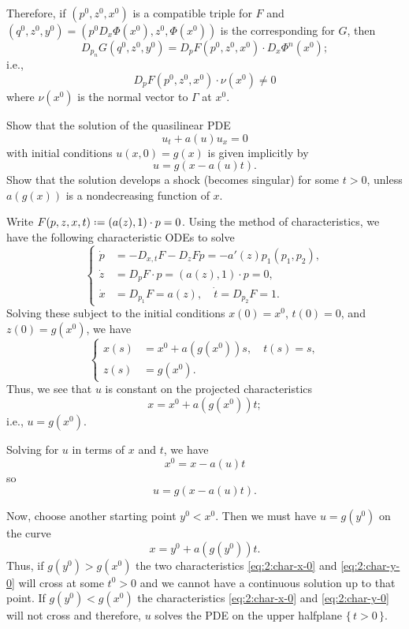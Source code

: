 \begin{solution*}
  Therefore, if \((p^0,z^0,x^0)\) is a compatible triple for \(F\) and
  \((q^0,z^0,y^0)=(p^0D_x\Phi(x^0),z^0,\Phi(x^0))\) is the corresponding
  for \(G\), then
  \[
    D_{p_n}G(q^0,z^0,y^0)=D_pF(p^0,z^0,x^0)\cdot D_x\Phi^n(x^0);
  \]
  i.e.,
  \[
    D_p F(p^0,z^0,x^0)\cdot\nu(x^0)\neq 0
  \]
  where \(\nu(x^0)\) is the normal vector to \(\Gamma\) at \(x^0\).
\end{solution*}

\begin{problem}
  Show that the solution of the quasilinear PDE
  \[
    u_t+a(u)u_x=0
  \]
  with initial conditions \(u(x,0)=g(x)\) is given implicitly by
  \[
    u=g(x-a(u)t).
  \]
  Show that the solution develops a shock (becomes singular) for some
  \(t>0\), unless \(a(g(x))\) is a nondecreasing function of
  \(x\).
\end{problem}
\begin{solution*}
  Write \(F(p,z,x,t)\defeq (a(z),1)\cdot p=0\). Using the method of
  characteristics, we have the following characteristic ODEs to solve
  \[
    \left\{
      \begin{aligned}
        \dot p&=-D_{x,t}F-D_zF p=-a'(z)p_1(p_1,p_2),\\
        \dot z&=D_pF\cdot p=(a(z),1)\cdot p=0,\\
        \dot x&=D_{p_1}F=a(z),\quad \dot t=D_{p_2}F=1.
      \end{aligned}
    \right.
  \]
  Solving these subject to the initial conditions \(x(0)=x^0\), \(t(0)=0\),
  and \(z(0)=g(x^0)\), we have
  \[
    \left\{
      \begin{aligned}
        x(s)&=x^0+a(g(x^0))s,\quad t(s)=s,\\
        z(s)&=g(x^0).
      \end{aligned}
    \right.
  \]
  Thus, we see that \(u\) is constant on the projected characteristics
  \begin{equation}
    \label{eq:2:char-x-0}
    x=x^0+a(g(x^0))t;
  \end{equation}
  i.e., \(u=g(x^0)\).

  Solving for \(u\) in terms of \(x\) and \(t\), we have
  \[
    x^0=x-a(u)t
  \]
  so
  \[
    u=g(x-a(u)t).
  \]

  Now, choose another starting point \(y^0<x^0\). Then we must have
  \(u=g(y^0)\) on the curve
  \begin{equation}
    \label{eq:2:char-y-0}
    x=y^0+a(g(y^0))t.
  \end{equation}
  Thus, if \(g(y^0)>g(x^0)\) the two characteristics \eqref{eq:2:char-x-0}
  and \eqref{eq:2:char-y-0} will cross at some \(t^0>0\) and we cannot have
  a continuous solution up to that point. If \(g(y^0)<g(x^0)\) the
  characteristics \eqref{eq:2:char-x-0} and \eqref{eq:2:char-y-0} will not
  cross and therefore, \(u\) solves the PDE on the upper halfplane
  \(\{\,t>0\,\}\).
\end{solution*}

